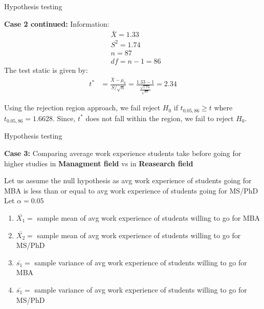 \documentclass{beamer}
\begin{document}
\begin{frame}{Hypothesis testing}
    \begin{block}{\textbf{Case 2 continued:}}
        Information:
        \begin{align}
             & \bar{X}= 1.33 \\
             & S^2 = 1.74    \\
             & n=87          \\
             & df = n-1 = 86
        \end{align}
        The test static is given by:
        \begin{align}
            t^* & = \frac{\bar{X} - \mu_0}{ S/ \sqrt{n}}
            = \frac{1.33 - 1}{\frac{\sqrt{1.74}}{\sqrt{87}}}
            = 2.34
        \end{align}

        Using the rejection region approach, we fail reject $H_0$ if
        $t_{0.05,86}\geq t$ where $t_{0.05,86} = 1.6628$. Since, $t^*$ does not
        fall
        within the region, we fail to reject $H_0$.
    \end{block}
\end{frame}

\begin{frame}{Hypothesis testing}

    \begin{block}{\textbf{Case 3:} Comparing average work experience students
            take before going for higher studies in \textbf{Managment field} vs
            in \textbf{Reasearch field} }

        Let us assume the null hypothesis as avg work experience of students
        going for MBA is less than or equal to avg work experience of students going
        for MS/PhD
        \\Let $\alpha=0.05$ \\
        \begin{enumerate}
            \item $\bar{X_1} = $ sample mean of avg work experience of students
                  willing to go for MBA \\
            \item $\bar{X_2} = $ sample mean of avg work experience of students
                  willing to go for MS/PhD \\
            \item $\bar{s_1} = $ sample variance of avg work experience of
                  students willing to go for MBA \\
            \item $\bar{s_1} = $ sample variance of avg work experience of
                  students willing to go for MS/PhD \\
        \end{enumerate}
    \end{block}

\end{frame}
\end{document}
